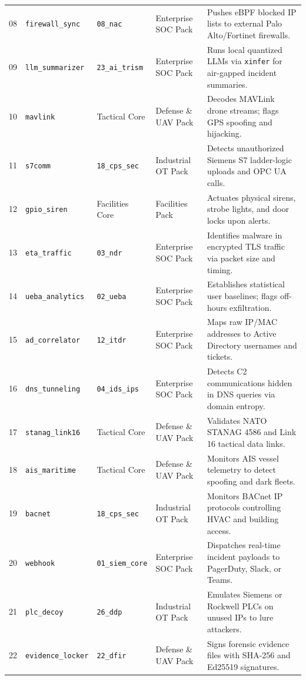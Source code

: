 \documentclass[11pt,a4paper]{article}
\begin{document}
\begin{footnotesize}
\begin{longtable}{@{}p{} p{} p{} p{} p{}@{}}
08 & \texttt{firewall\_sync} & \texttt{08\_nac} & Enterprise SOC Pack & Pushes eBPF blocked IP lists to external Palo Alto/Fortinet firewalls. \\
09 & \texttt{llm\_summarizer} & \texttt{23\_ai\_trism} & Enterprise SOC Pack & Runs local quantized LLMs via \texttt{xinfer} for air-gapped incident summaries. \\
10 & \texttt{mavlink} & Tactical Core & Defense \& UAV Pack & Decodes MAVLink drone streams; flags GPS spoofing and hijacking. \\
11 & \texttt{s7comm} & \texttt{18\_cps\_sec} & Industrial OT Pack & Detects unauthorized Siemens S7 ladder-logic uploads and OPC UA calls. \\
12 & \texttt{gpio\_siren} & Facilities Core & Facilities Pack & Actuates physical sirens, strobe lights, and door locks upon alerts. \\
13 & \texttt{eta\_traffic} & \texttt{03\_ndr} & Enterprise SOC Pack & Identifies malware in encrypted TLS traffic via packet size and timing. \\
14 & \texttt{ueba\_analytics} & \texttt{02\_ueba} & Enterprise SOC Pack & Establishes statistical user baselines; flags off-hours exfiltration. \\
15 & \texttt{ad\_correlator} & \texttt{12\_itdr} & Enterprise SOC Pack & Maps raw IP/MAC addresses to Active Directory usernames and tickets. \\
16 & \texttt{dns\_tunneling} & \texttt{04\_ids\_ips} & Enterprise SOC Pack & Detects C2 communications hidden in DNS queries via domain entropy. \\
17 & \texttt{stanag\_link16} & Tactical Core & Defense \& UAV Pack & Validates NATO STANAG 4586 and Link 16 tactical data links. \\
18 & \texttt{ais\_maritime} & Tactical Core & Defense \& UAV Pack & Monitors AIS vessel telemetry to detect spoofing and dark fleets. \\
19 & \texttt{bacnet} & \texttt{18\_cps\_sec} & Industrial OT Pack & Monitors BACnet IP protocols controlling HVAC and building access. \\
20 & \texttt{webhook} & \texttt{01\_siem\_core} & Enterprise SOC Pack & Dispatches real-time incident payloads to PagerDuty, Slack, or Teams. \\
21 & \texttt{plc\_decoy} & \texttt{26\_ddp} & Industrial OT Pack & Emulates Siemens or Rockwell PLCs on unused IPs to lure attackers. \\
22 & \texttt{evidence\_locker} & \texttt{22\_dfir} & Defense \& UAV Pack & Signs forensic evidence files with SHA-256 and Ed25519 signatures. \\

\end{longtable}
\end{footnotesize}
\end{document}
